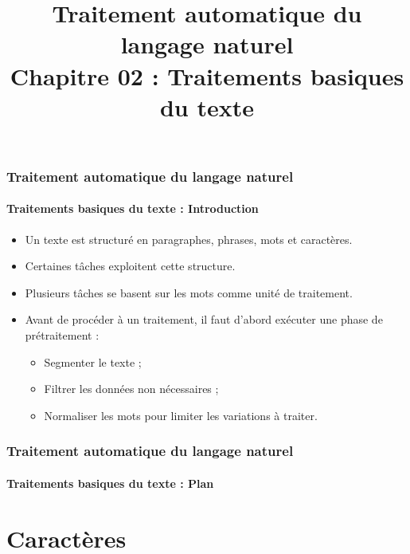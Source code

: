 \documentclass[xcolor=table]{beamer}
\title[TALN : 02- Traitements basiques]%
{Traitement automatique du langage naturel\\Chapitre 02 : Traitements basiques du texte}
\begin{document}
	
\begin{frame}
\frametitle{Traitement automatique du langage naturel}
\framesubtitle{Traitements basiques du texte : Introduction}

\begin{itemize}
	\item Un texte est structuré en paragraphes, phrases, mots et caractères.
	\item Certaines tâches exploitent cette structure.
	\item Plusieurs tâches se basent sur les mots comme unité de traitement.
	\item Avant de procéder à un traitement, il faut d'abord exécuter une phase de prétraitement :
	\begin{itemize}
		\item Segmenter le texte ;
		\item Filtrer les données non nécessaires ;
		\item Normaliser les mots pour limiter les variations à traiter.
	\end{itemize}
\end{itemize}

\end{frame}


\begin{frame}
\frametitle{Traitement automatique du langage naturel}
\framesubtitle{Traitements basiques du texte : Plan}

\begin{multicols}{2}
\tableofcontents
\end{multicols}
\end{frame}

\section{Caractères}
\end{document}
